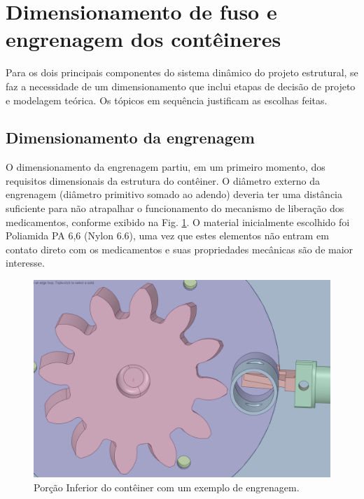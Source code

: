 \section{Dimensionamento de fuso e engrenagem dos contêineres} \label{section:dimensionamento_F_E} 

Para os dois principais componentes do sistema dinâmico do projeto estrutural, se faz a necessidade de um dimensionamento que inclui etapas de decisão de projeto e modelagem teórica. Os tópicos em sequência justificam as escolhas feitas.

\subsection{Dimensionamento da engrenagem}

O dimensionamento da engrenagem partiu, em um primeiro momento, dos requisitos dimensionais da estrutura do contêiner. O diâmetro externo da engrenagem (diâmetro primitivo somado ao adendo) deveria ter uma distância suficiente para não atrapalhar o funcionamento do mecanismo de liberação dos medicamentos, conforme exibido na Fig. \ref{fig:mangueira_engrenagem}. O material inicialmente escolhido foi Poliamida PA 6,6 (Nylon 6.6), uma vez que estes elementos não entram em contato direto com os medicamentos e suas propriedades mecânicas são de maior interesse.

\begin{figure}[H]
        \centering
        \includegraphics[width=.7\textwidth]{figuras/estrutura/Design/engrenagem_mangueira.png}
        \caption{Porção Inferior do contêiner com um exemplo de engrenagem.}
        \label{fig:mangueira_engrenagem}
    \end{figure} 

